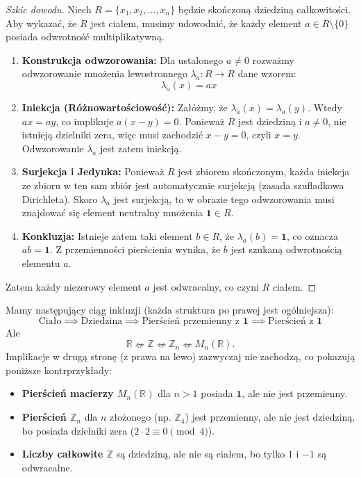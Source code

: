 \begin{proof}[Szkic dowodu]
Niech $R = \{x_1, x_2, \dots, x_n\}$ będzie skończoną dziedziną całkowitości. 
Aby wykazać, że $R$ jest ciałem, musimy udowodnić, że każdy element $a \in R \setminus \{0\}$ posiada odwrotność multiplikatywną.

\begin{enumerate}
    \item \textbf{Konstrukcja odwzorowania:} Dla ustalonego $a \neq 0$ rozważmy odwzorowanie mnożenia lewostronnego $\lambda_a: R \to R$ dane wzorem:
    \[ \lambda_a(x) = ax \]
    
    \item \textbf{Iniekcja (Różnowartościowość):} Załóżmy, że $\lambda_a(x) = \lambda_a(y)$. Wtedy $ax = ay$, co implikuje $a(x-y) = 0$. 
    Ponieważ $R$ jest dziedziną i $a \neq 0$, nie istnieją dzielniki zera, więc musi zachodzić $x-y = 0$, czyli $x=y$. 
    Odwzorowanie $\lambda_a$ jest zatem iniekcją.
    
    \item \textbf{Surjekcja i Jedynka:} Ponieważ $R$ jest zbiorem skończonym, każda iniekcja ze zbioru w ten sam zbiór jest automatycznie surjekcją (zasada szufladkowa Dirichleta). 
    Skoro $\lambda_a$ jest surjekcją, to w obrazie tego odwzorowania musi znajdować się element neutralny mnożenia $\mathbf{1} \in R$.
    
    \item \textbf{Konkluzja:} Istnieje zatem taki element $b \in R$, że $\lambda_a(b) = \mathbf{1}$, co oznacza $ab = \mathbf{1}$. 
    Z przemienności pierścienia wynika, że $b$ jest szukaną odwrotnością elementu $a$.
\end{enumerate}
Zatem każdy niezerowy element $a$ jest odwracalny, co czyni $R$ ciałem.
\end{proof}

\begin{remark}
Mamy następujący ciąg inkluzji (każda struktura po prawej jest ogólniejsza):
\[ \text{Ciało} \implies \text{Dziedzina} \implies \text{Pierścień przemienny z } \mathbf{1} \implies \text{Pierścień z } \mathbf{1} \]
Ale
	\[
	\mathbb{R} \nLeftarrow \mathbb{Z} \nLeftarrow \mathbb{Z} _{n} \nLeftarrow M_{n}\left( \mathbb{R}  \right) 
	.\] 
Implikacje w drugą stronę (z prawa na lewo) zazwyczaj nie zachodzą, co pokazują poniższe kontrprzykłady:
\begin{itemize}
	\item \textbf{Pierścień macierzy $M_n(\mathbb{R})$} dla $n > 1$ posiada $\mathbf{1}$, ale nie jest przemienny.
	\item \textbf{Pierścień $\mathbb{Z}_n$} dla $n$ złożonego (np. $\mathbb{Z}_4$) jest przemienny, ale nie jest dziedziną, bo posiada dzielniki zera ($2 \cdot 2 \equiv 0 \pmod 4$).
	\item \textbf{Liczby całkowite $\mathbb{Z}$} są dziedziną, ale nie są ciałem, bo tylko $1$ i $-1$ są odwracalne.
\end{itemize}
\end{remark}

